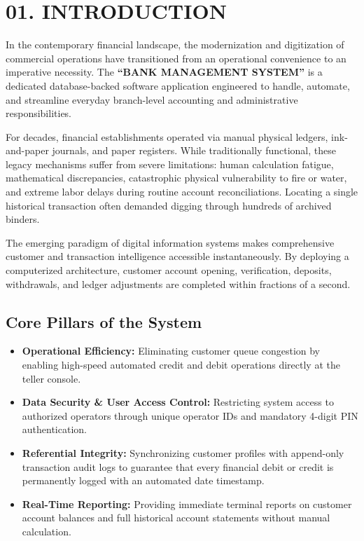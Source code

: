 \documentclass[12pt,a4paper]{article}
\begin{document}
\section*{01. INTRODUCTION}
\vspace{0.5em}

In the contemporary financial landscape, the modernization and digitization of commercial operations have transitioned from an operational convenience to an imperative necessity. The \textbf{``BANK MANAGEMENT SYSTEM''} is a dedicated database-backed software application engineered to handle, automate, and streamline everyday branch-level accounting and administrative responsibilities.

\vspace{0.4em}
For decades, financial establishments operated via manual physical ledgers, ink-and-paper journals, and paper registers. While traditionally functional, these legacy mechanisms suffer from severe limitations: human calculation fatigue, mathematical discrepancies, catastrophic physical vulnerability to fire or water, and extreme labor delays during routine account reconciliations. Locating a single historical transaction often demanded digging through hundreds of archived binders.

\vspace{0.4em}
The emerging paradigm of digital information systems makes comprehensive customer and transaction intelligence accessible instantaneously. By deploying a computerized architecture, customer account opening, verification, deposits, withdrawals, and ledger adjustments are completed within fractions of a second.

\vspace{0.4em}
\subsection*{Core Pillars of the System}
\begin{itemize}
    \item \textbf{Operational Efficiency:} Eliminating customer queue congestion by enabling high-speed automated credit and debit operations directly at the teller console.
    \item \textbf{Data Security \& User Access Control:} Restricting system access to authorized operators through unique operator IDs and mandatory 4-digit PIN authentication.
    \item \textbf{Referential Integrity:} Synchronizing customer profiles with append-only transaction audit logs to guarantee that every financial debit or credit is permanently logged with an automated date timestamp.
    \item \textbf{Real-Time Reporting:} Providing immediate terminal reports on customer account balances and full historical account statements without manual calculation.
\end{itemize}
\end{document}
